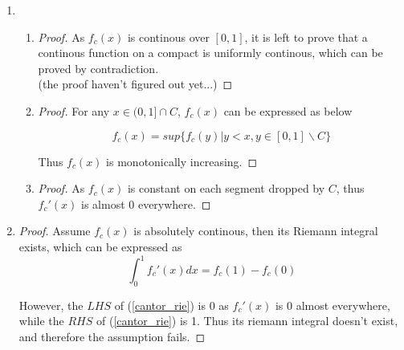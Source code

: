 \documentclass[paper=a4, fontsize=11pt]{scrartcl} %
\numberwithin{equation}{section} %
\numberwithin{figure}{section} %
\numberwithin{table}{section} %
\begin{document}
\begin{enumerate}
\begin{proof}
				and the target $N$ is given as above.
			\end{proof}
		\item 
			\begin{enumerate}
				\item 
					\begin{proof}
						As $f_c(x)$ is continous over $[0, 1]$, it is left to prove that a continous function on a compact is uniformly continous, which can be proved by contradiction.\\
						(the proof haven't figured out yet...)
					\end{proof}
				
				\item 
					\begin{proof}
						For any $x \in (0, 1] \cap C$, $f_c(x)$ can be expressed as below
						
						\begin{equation}
							f_c(x) = sup\{ f_c(y) | y < x, y \in [0, 1] \backslash C  \}
						\end{equation}
						
						Thus $f_c(x)$ is monotonically increasing.
					\end{proof}
				
				\item
					\begin{proof}
						As $f_c(x)$ is constant on each segment dropped by $C$, thus $f_c'(x)$ is almost 0 everywhere.
					\end{proof} 
				
			\end{enumerate}
			
		\item 
			\begin{proof}
				Assume $f_c(x)$  is absolutely continous, then its Riemann integral exists, which can be expressed as 
				\begin{equation}
					\int_{0}^{1} f_c'(x) dx = f_c(1) - f_c(0) \label{cantor_rie}
				\end{equation} 
				
				However, the $LHS$ of (\ref{cantor_rie}) is 0 as $f_c'(x)$ is 0 almost everywhere, while the $RHS$ of (\ref{cantor_rie}) is 1. Thus its riemann integral doesn't exist, and therefore the assumption fails.
				
			\end{proof}
		
			
			
			
		
	\end{enumerate}
\end{document}
